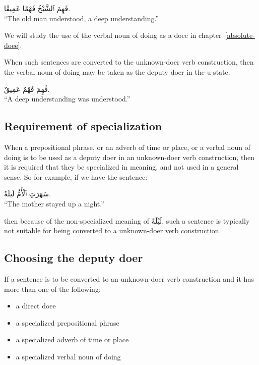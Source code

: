 \documentclass[
  10pt,
]{book}
\providecommand{\tightlist}{%
  \setlength{\itemsep}{0pt}\setlength{\parskip}{0pt}}
\begin{document}
\foreignlanguage{arabic}{فَهِمَ ٱلشَّيْخُ فَهْمًا عَمِيقًا.}\\
\enquote{The old man understood, a deep understanding.}

We will study the use of the verbal noun of doing as a doee in chapter~\ref{absolute-doee}.

When such sentences are converted to the unknown-doer verb construction, then the verbal noun of doing may be taken as the deputy doer in the u-state.

\foreignlanguage{arabic}{فُهِمَ فَهْمٌ عَمِيقٌ.}\\
\enquote{A deep understanding was understood.}

\subsection{Requirement of specialization}\label{requirement-of-specialization}

When a prepositional phrase, or an adverb of time or place, or a verbal noun of doing is to be used as a deputy doer in an unknown-doer verb construction, then it is required that they be specialized in meaning, and not used in a general sense. So for example, if we have the sentence:

\foreignlanguage{arabic}{سَهَرَتِ ٱلْأُمُّ لَيلَةً.}\\
\enquote{The mother stayed up a night.}

then because of the non-specialized meaning of \foreignlanguage{arabic}{لَيْلَةً}, such a sentence is typically not suitable for being converted to a unknown-doer verb construction.

\subsection{Choosing the deputy doer}\label{choosing-the-deputy-doer}

If a sentence is to be converted to an unknown-doer verb construction and it has more than one of the following:

\begin{itemize}
\tightlist
\item
  a direct doee
\item
  a specialized prepositional phrase
\item
  a specialized adverb of time or place
\item
  a specialized verbal noun of doing
\end{itemize}
\end{document}
